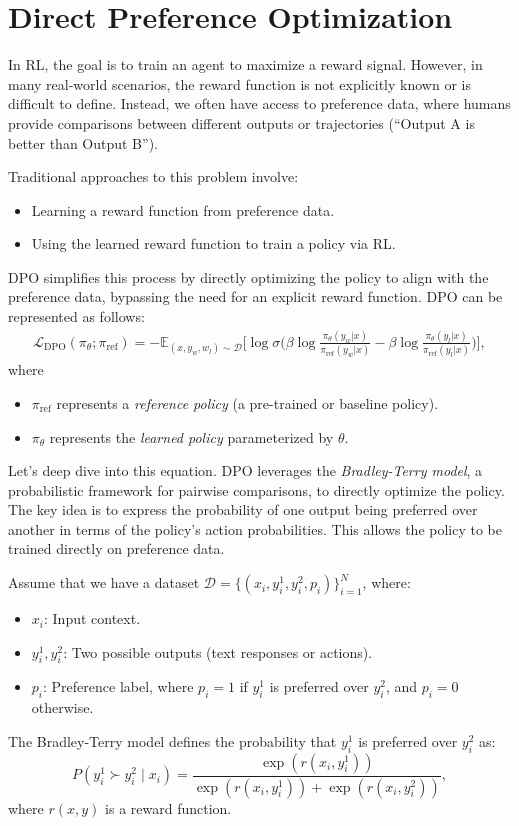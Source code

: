 \section{Direct Preference Optimization}
\label{sec:nlp_dpo}

In RL, the goal is to train an agent to maximize a reward signal. However, in many real-world scenarios, the reward function is not explicitly known or is difficult to define. Instead, we often have access to preference data, where humans provide comparisons between different outputs or trajectories (\eg ``Output A is better than Output B'').

Traditional approaches to this problem involve:
\begin{itemize}
	\item Learning a reward function from preference data.
	\item Using the learned reward function to train a policy via RL.
\end{itemize}
DPO simplifies this process by directly optimizing the policy to align with the preference data, bypassing the need for an explicit reward function. DPO can be represented as follows:
\begin{align}
	\mathcal{L}_{\text{DPO}}(\pi_\theta; \pi_{\text{ref}}) = -\mathbb{E}_{(x, y_w, w_l)\sim \mathcal{D}}\bigg[\log \sigma \bigg(\beta \log \frac{\pi_\theta(y_w|x)}{\pi_{\text{ref}}(y_w|x)}-\beta \log \frac{\pi_\theta(y_l|x)}{\pi_{\text{ref}}(y_l|x)}\bigg)\bigg], 
	\label{eq:dpo_loss}
\end{align}
where
\begin{itemize}
	\item \( \pi_{\text{ref}} \) represents a \textit{reference policy} (\eg a pre-trained or baseline policy).
	\item \( \pi_{\theta} \) represents the \textit{learned policy} parameterized by \( \theta \).
\end{itemize}

Let's deep dive into this equation. DPO leverages the \textit{Bradley-Terry model}, a probabilistic framework for pairwise comparisons, to directly optimize the policy. The key idea is to express the probability of one output being preferred over another in terms of the policy's action probabilities. This allows the policy to be trained directly on preference data. 

Assume that we have a dataset \( \mathcal{D} = \{(x_i, y_i^1, y_i^2, p_i)\}_{i=1}^N \), where:
\begin{itemize}
	\item \( x_i \): Input context.
	\item \( y_i^1, y_i^2 \): Two possible outputs (\eg text responses or actions).
	\item \( p_i \): Preference label, where \( p_i = 1 \) if \( y_i^1 \) is preferred over \( y_i^2 \), and \( p_i = 0 \) otherwise.
\end{itemize}
The Bradley-Terry model defines the probability that \( y_i^1 \) is preferred over \( y_i^2 \) as:
\[
P(y_i^1 \succ y_i^2 \mid x_i) = \frac{\exp(r(x_i, y_i^1))}{\exp(r(x_i, y_i^1)) + \exp(r(x_i, y_i^2))},
\]
where \( r(x, y) \) is a reward function.

